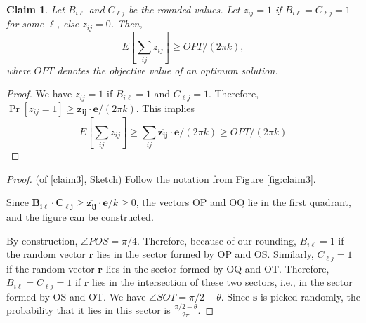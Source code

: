 \documentclass[11pt]{article}
\newtheorem{claim}[lemma]{Claim} %
\begin{document}
\begin{claim}
\label{claim4}
Let $B_{i\ell}$ and $C_{\ell j}$ be the rounded values. Let $z_{ij}=1$
if $B_{i\ell}= C_{\ell j}=1$ for some $\ell$, else $z_{ij}=0$.
Then,
\[
E[\sum_{ij} z_{ij}] \geq OPT/(2\pi k),
\]
where $OPT$ denotes the objective value of an optimum solution.
\end{claim}
\begin{proof}
We have $z_{ij}=1$ if $B_{i\ell}=1$ and $C_{\ell j}=1$. Therefore,
$\Pr[z_{ij}=1] \geq \overline{\mathbf{z_{ij}}}\cdot\mathbf{e}/(2\pi k)$.
This implies
\[
E[\sum_{ij} z_{ij}] \geq \sum_{ij} \overline{\mathbf{z_{ij}}}\cdot\mathbf{e}/(2\pi k)
\geq OPT/(2\pi k)
\]
\end{proof}
\iffalse
\begin{figure}
\centering
\includegraphics[width  = 0.5cm, height = 0.5cm][figs/projection.pdf}
\caption{
Consider the 2D plane formed by the vectors $\overline{\mathbf{B_{i\ell}}}$
and $\overline{\mathbf{C_{\ell j}}}$.
Let OP and OQ denote the vectors $\overline{\mathbf{B_{i\ell}}}$
and $\overline{\mathbf{C_{\ell j}}}$, respectively. We assume the
space is rotated, so the vectors are symmetric with respect to line
OR, which denotes the line at angle $\pi/4$ (i.e., bisects OP and OQ).
Let $\angle POQ=\theta$. Then, $\angle UOP = \angle VOQ = (\pi/2 - \theta)/2$.
Let OS be the line such that $\angle ROS = (\pi/2 - \theta)/2$.
Similarly, let OT be the line such that $\angle ROT = (\pi/2 - \theta)/2$.
}
\label{fig:claim3}
\end{figure}
\fi
\begin{proof} (of \ref{claim3}, Sketch)
Follow the notation from Figure \ref{fig:claim3}.

Since $\overline{\mathbf{B_{i\ell}}}\cdot \overline{\mathbf{C_{\ell j}}}\geq 
\overline{\mathbf{z_{ij}}}\cdot\mathbf{e}/k \geq 0$, the vectors OP and OQ lie
in the first quadrant, and the figure can be constructed.

By construction, $\angle POS = \pi/4$. Therefore,
because of our rounding, $B_{i\ell}=1$ if the random vector $\mathbf{r}$ lies
in the sector formed by OP and OS. Similarly, $C_{\ell j}=1$ if the
random vector $\mathbf{r}$ lies in the sector formed by OQ and OT.
Therefore, $B_{i\ell}=C_{\ell j}=1$ if $\mathbf{r}$ lies in the intersection
of these two sectors, i.e., in the sector formed by OS and OT.
We have $\angle SOT = \pi/2 -\theta$. Since $\mathbf{s}$ is picked randomly,
the probability that it lies in this sector is $\frac{\pi/2 -\theta}{2\pi}$.
\end{proof}



\end{document}
